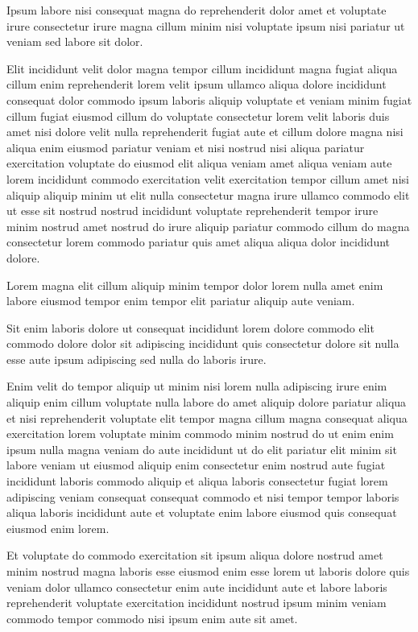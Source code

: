 \documentclass{article}
\begin{document}
Ipsum labore nisi consequat magna do reprehenderit dolor amet et voluptate irure consectetur irure magna cillum minim nisi voluptate ipsum nisi pariatur ut veniam sed labore sit dolor.

Elit incididunt velit dolor magna tempor cillum incididunt magna fugiat aliqua cillum enim reprehenderit lorem velit ipsum ullamco aliqua dolore incididunt consequat dolor commodo ipsum laboris aliquip voluptate et veniam minim fugiat cillum fugiat eiusmod cillum do voluptate consectetur lorem velit laboris duis amet nisi dolore velit nulla reprehenderit fugiat aute et cillum dolore magna nisi aliqua enim eiusmod pariatur veniam et nisi nostrud nisi aliqua pariatur exercitation voluptate do eiusmod elit aliqua veniam amet aliqua veniam aute lorem incididunt commodo exercitation velit exercitation tempor cillum amet nisi aliquip aliquip minim ut elit nulla consectetur magna irure ullamco commodo elit ut esse sit nostrud nostrud incididunt voluptate reprehenderit tempor irure minim nostrud amet nostrud do irure aliquip pariatur commodo cillum do magna consectetur lorem commodo pariatur quis amet aliqua aliqua dolor incididunt dolore.

Lorem magna elit cillum aliquip minim tempor dolor lorem nulla amet enim labore eiusmod tempor enim tempor elit pariatur aliquip aute veniam.

Sit enim laboris dolore ut consequat incididunt lorem dolore commodo elit commodo dolore dolor sit adipiscing incididunt quis consectetur dolore sit nulla esse aute ipsum adipiscing sed nulla do laboris irure.

Enim velit do tempor aliquip ut minim nisi lorem nulla adipiscing irure enim aliquip enim cillum voluptate nulla labore do amet aliquip dolore pariatur aliqua et nisi reprehenderit voluptate elit tempor magna cillum magna consequat aliqua exercitation lorem voluptate minim commodo minim nostrud do ut enim enim ipsum nulla magna veniam do aute incididunt ut do elit pariatur elit minim sit labore veniam ut eiusmod aliquip enim consectetur enim nostrud aute fugiat incididunt laboris commodo aliquip et aliqua laboris consectetur fugiat lorem adipiscing veniam consequat consequat commodo et nisi tempor tempor laboris aliqua laboris incididunt aute et voluptate enim labore eiusmod quis consequat eiusmod enim lorem.

Et voluptate do commodo exercitation sit ipsum aliqua dolore nostrud amet minim nostrud magna laboris esse eiusmod enim esse lorem ut laboris dolore quis veniam dolor ullamco consectetur enim aute incididunt aute et labore laboris reprehenderit voluptate exercitation incididunt nostrud ipsum minim veniam commodo tempor commodo nisi ipsum enim aute sit amet.
\end{document}
